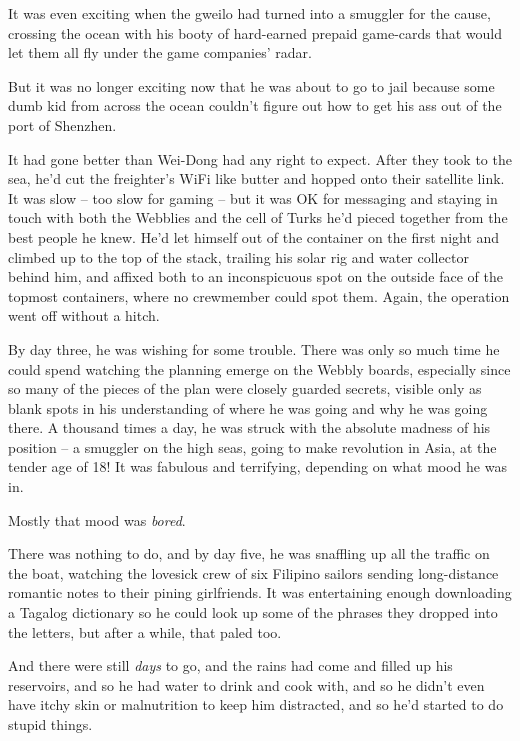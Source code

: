 It was even exciting when the gweilo had turned into a smuggler for
the cause, crossing the ocean with his booty of hard-earned prepaid
game-cards that would let them all fly under the game companies'
radar.

But it was no longer exciting now that he was about to go to jail
because some dumb kid from across the ocean couldn't figure out how
to get his ass out of the port of Shenzhen.

\tb

It had gone better than Wei-Dong had any right to expect. After
they took to the sea, he'd cut the freighter's WiFi like butter and
hopped onto their satellite link. It was slow -- too slow for
gaming -- but it was OK for messaging and staying in touch with
both the Webblies and the cell of Turks he'd pieced together from
the best people he knew. He'd let himself out of the container on
the first night and climbed up to the top of the stack, trailing
his solar rig and water collector behind him, and affixed both to
an inconspicuous spot on the outside face of the topmost
containers, where no crewmember could spot them. Again, the
operation went off without a hitch.

By day three, he was wishing for some trouble. There was only so
much time he could spend watching the planning emerge on the Webbly
boards, especially since so many of the pieces of the plan were
closely guarded secrets, visible only as blank spots in his
understanding of where he was going and why he was going there. A
thousand times a day, he was struck with the absolute madness of
his position -- a smuggler on the high seas, going to make
revolution in Asia, at the tender age of 18! It was fabulous and
terrifying, depending on what mood he was in.

Mostly that mood was \emph{bored}.

There was nothing to do, and by day five, he was snaffling up all
the traffic on the boat, watching the lovesick crew of six Filipino
sailors sending long-distance romantic notes to their pining
girlfriends. It was entertaining enough downloading a Tagalog
dictionary so he could look up some of the phrases they dropped
into the letters, but after a while, that paled too.

And there were still \emph{days} to go, and the rains had come and
filled up his reservoirs, and so he had water to drink and cook
with, and so he didn't even have itchy skin or malnutrition to keep
him distracted, and so he'd started to do stupid things.

